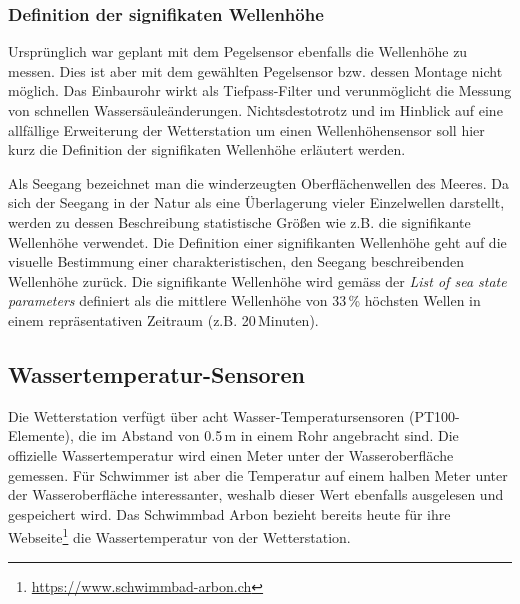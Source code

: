 \subsubsection{Definition der signifikaten Wellenhöhe}
Ursprünglich war geplant mit dem Pegelsensor ebenfalls die Wellenhöhe zu messen. Dies ist aber mit dem gewählten Pegelsensor bzw. dessen Montage nicht möglich. Das Einbaurohr wirkt als Tiefpass-Filter und verunmöglicht die Messung von schnellen Wassersäuleänderungen. Nichtsdestotrotz und im Hinblick auf eine allfällige Erweiterung der Wetterstation um einen Wellenhöhensensor soll hier kurz die Definition der signifikaten Wellenhöhe erläutert werden.

Als Seegang bezeichnet man die winderzeugten Oberflächenwellen des Meeres. Da sich der Seegang in der Natur als eine Überlagerung vieler Einzelwellen darstellt, werden zu dessen Beschreibung statistische Größen wie z.B. die signifikante Wellenhöhe verwendet. Die Definition einer signifikanten Wellenhöhe geht auf die visuelle Bestimmung einer charakteristischen, den Seegang beschreibenden Wellenhöhe zurück. Die signifikante Wellenhöhe wird gemäss der \emph{List of sea state parameters}\cite{1986Iahr} definiert als die mittlere Wellenhöhe von 33\,\% höchsten Wellen in einem repräsentativen Zeitraum (z.B. 20\,Minuten).

\subsection{Wassertemperatur-Sensoren}
Die Wetterstation verfügt über acht Wasser-Temperatursensoren (PT100-Elemente), die im Abstand von 0.5\,m in einem Rohr angebracht sind. Die offizielle Wassertemperatur wird einen Meter unter der Wasseroberfläche gemessen. Für Schwimmer ist aber die Temperatur auf einem halben Meter unter der Wasseroberfläche interessanter, weshalb dieser Wert ebenfalls ausgelesen und gespeichert wird. Das Schwimmbad Arbon bezieht bereits heute für ihre Webseite\footnote{\url{https://www.schwimmbad-arbon.ch}} die Wassertemperatur von der Wetterstation.

